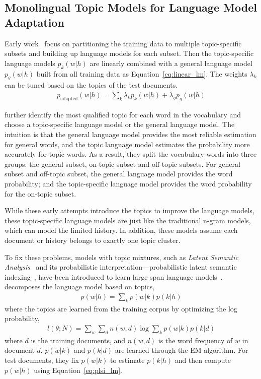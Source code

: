 \subsection{Monolingual Topic Models for Language Model Adaptation}

Early work~\citet{Clarkson-1997,Seymore-1997,Kneser-1997,Iyer-1999} focus on
partitioning the training data to multiple topic-specific subsets and
building up language models for each subset. Then the topic-specific
language models $p_k(w|h)$ are linearly combined with a general
language model $p_g(w|h)$ built from all training data as
Equation~\ref{eq:linear_lm}. The weights $\lambda_k$ can be tuned
based on the topics of the test documents.
\begin{align}
\label{eq:linear_lm}
p_\textrm{adapted}(w|h) = \sum_k \lambda_k p_k(w|h) + \lambda_g p_g(w|h)
\end{align}

\citet{Seymore-1998} further identify the most qualified topic for
each word in the vocabulary and choose a topic-specific language model
or the general language model. The intuition is that the general
language model provides the most reliable estimation for general
words, and the topic language model estimates the probability more
accurately for topic words. As a result, they split the vocabulary
words into three groups: the general subset, on-topic subset and
off-topic subsets. For general subset and off-topic subset, the
general language model provides the word probability; and the
topic-specific language model provides the word probability for the
on-topic subset.

While these early attempts introduce the topics to improve the
language models, these topic-specific language models are just like
the traditional n-gram models, which can model the limited
history. In addition, these models assume each document or history belongs
to exactly one topic cluster.

To fix these problems, models with topic mixtures, such as
\emph{Latent Semantic Analysis}~\citep[\textsc{lsa}]{deerwester-90}
and its probabilistic interpretation---probabilistic latent semantic
indexing~\citep[\textsc{plsi}]{hofmann-99}, have been introduced to
learn large-span language
models~\citep{Bellegarda-1997,Coccaro-1998,Gildea-1999}. \citet{Gildea-1999}
decomposes the language model based on topics,
\begin{align}
\label{eq:plsi_lm}
p(w|h) = \sum_k p(w|k) p(k|h)
\end{align}
where the topics are learned from the training corpus by optimizing the log probability,
\begin{align}
l(\theta; N) = \sum_w \sum_d n(w,d) \log \sum_k p(w|k) p(k|d)
\end{align}
where $d$ is the training documents, and $n(w,d)$ is the word frequency of $w$ in document $d$. $p(w|k)$ and $p(k|d)$ are learned through the EM algorithm. For test documents, they fix $p(w|k)$ to estimate $p(k|h)$ and then compute $p(w|h)$ using Equation~\ref{eq:plsi_lm}. 

